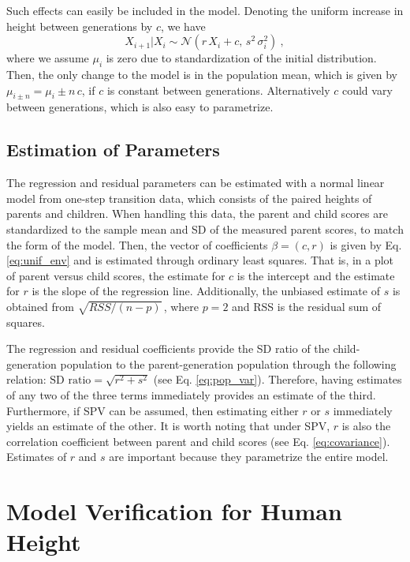 \documentclass{svproc} %
\begin{document}
Such effects can easily be included in the model. Denoting the uniform increase in height between generations by $c$, we have 
\begin{equation}
X_{i+1}|X_i \sim \mathcal{N}(r \, X_i + c, \, s^2 \, \sigma_i^2) \ ,
\label{eq:unif_env}
\end{equation}
where we assume $\mu_i$ is zero due to standardization of the initial distribution. Then, the only change to the model is in the population mean, which is given by $\mu_{i \pm n} = \mu_i \pm n \, c$, if $c$ is constant between generations. Alternatively $c$ could vary between generations, which is also easy to parametrize.


\subsection{Estimation of Parameters} \label{estimation}

The regression and residual parameters can be estimated with a normal linear model from one-step transition data, which consists of the paired heights of parents and children. When handling this data, the parent and child scores are standardized to the sample mean and SD of the measured parent scores, to match the form of the model. Then, the vector of coefficients $\beta = (c, r)$ is given by Eq. \ref{eq:unif_env} and is estimated through ordinary least squares. That is, in a plot of parent versus child scores, the estimate for $c$ is the intercept and the estimate for $r$ is the slope of the regression line. Additionally, the unbiased estimate of $s$ is obtained from $\sqrt{RSS / (n-p)} \,$, where $p = 2$ and RSS is the residual sum of squares. 


The regression and residual coefficients provide the SD ratio of the child-generation population to the parent-generation population through the following relation: $\mathrm{SD}\,\, \mathrm{ratio} =  \sqrt{r^2+s^2}$ (see Eq. \ref{eq:pop_var}). Therefore, having estimates of any two of the three terms immediately provides an estimate of the third. Furthermore, if SPV can be assumed, then estimating either $r$ or $s$ immediately yields an estimate of the other. It is worth noting that under SPV, $r$ is also the correlation coefficient between parent and child scores (see Eq. \ref{eq:covariance}). Estimates of $r$ and $s$ are important because they parametrize the entire model.



\section{Model Verification for Human Height}
\end{document}
